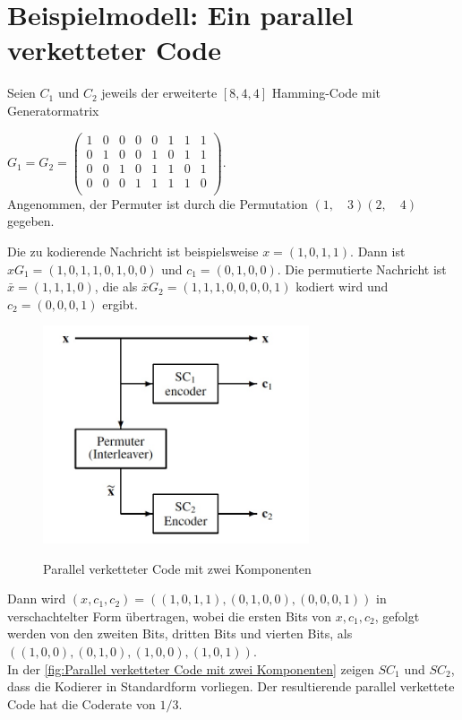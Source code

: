 \section{Beispielmodell: Ein parallel verketteter Code}

\begin{Beispiel}
Seien $C_1$ und $C_2$ jeweils der erweiterte $[8, 4, 4]$ Hamming-Code mit Generatormatrix


$G_{1}=G_2=\left( \begin{array}{rrrrrrrr}
    1 & 0 & 0 & 0 & 0 & 1 & 1 & 1 \\
    0 & 1 & 0 & 0 & 1 & 0 & 1 & 1 \\
    0 & 0 & 1 & 0 & 1 & 1 & 0 & 1 \\
    0 & 0 & 0 & 1 & 1 & 1 & 1 & 0 \\
   \end{array}\right). 
$\\

Angenommen, der Permuter ist durch die Permutation $(1,\quad 3)(2,\quad 4)$ gegeben.

Die zu kodierende Nachricht ist beispielsweise $x = (1,0,1,1).$ Dann ist $xG_1 = (1,0,1,1,0,1,0,0)$ und   $c_1 = (0,1,0,0)$. Die permutierte Nachricht ist $\bar{x} = (1,1,1,0)$, die als $\bar{x}G_2 = (1,1,1,0,0,0,0,1)$ kodiert wird und $c_2 = (0,0,0,1)$ ergibt.


\begin{figure}[!ht]
    \centering
     {\includegraphics[width=0.7\textwidth]{./pic/Parallel verketteter Code mit zwei Komponenten}}
    \caption{ Parallel verketteter Code mit zwei Komponenten}
    \label{fig:Parallel verketteter Code mit zwei  Komponenten}
\end{figure} 

Dann wird $(x, c_1, c_2) = ((1,0,1,1), (0,1,0,0), (0,0,0,1))$ in verschachtelter Form übertragen, wobei die ersten Bits von $x, c_1, c_2$, gefolgt werden von den zweiten Bits, dritten Bits und vierten Bits, als $((1,0,0), (0,1,0), (1,0,0), (1,0,1)).$\\

In der \autoref{fig:Parallel verketteter Code mit zwei Komponenten} zeigen $SC_1$ und $SC_2$, 
dass die Kodierer in Standardform vorliegen. 
Der resultierende parallel verkettete Code hat die Coderate von $1/3$.
\end{Beispiel} \cite[S. 9]{huffman}
\pagebreak

